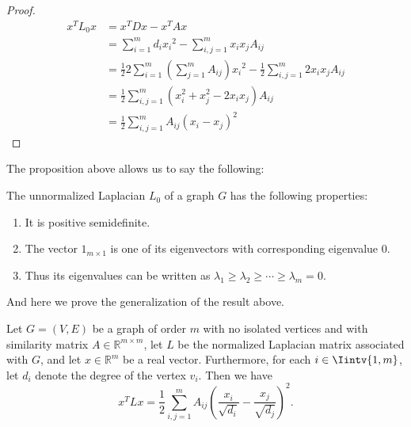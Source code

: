 \begin{proof}
   \begin{equation*} 
      \begin{split}
         x^TL_0x &= x^TDx - x^TAx \\
         &= \sum_{i=1}^m d_i{x_i}^2 - \sum_{i,j = 1}^m x_i  x_j A_{ij}  \\
         &= \frac{1}{2} 2 \sum_{i=1}^m \left( \sum_{j=1}^mA_{ij} \right){x_i}^2 - \frac{1}{2}\sum_{i,j = 1}^m 2x_i  x_j A_{ij}  \\
         &= \frac{1}{2} \sum_{i,j=1}^m (x_i^2 +x_j^2 - 2x_ix_j)A_{ij} \\
         &= \frac{1}{2} \sum_{i,j=1}^m A_{ij} \left( x_i - x_j \right) ^2
      \end{split}
   \end{equation*}
\end{proof}
   The proposition above allows us to say the following:
\begin{corollary}\label{unnormalizedLaplacianProperties}
   The unnormalized Laplacian $L_0$ of a graph $G$ has the following properties:
   \begin{enumerate}
      \item It is positive semidefinite.
      \item The vector $1_{m \times 1}$ is one of its eigenvectors with corresponding eigenvalue $0$.
      \item Thus its eigenvalues can be written as $\lambda_1 \ge \lambda_2 \ge \cdots \ge \lambda_m = 0$.
   \end{enumerate}
\end{corollary}

And here we prove the generalization of the result above.

\begin{proposition}\label{xtlx2}
   Let $G = (V,E)$ be a graph of order $m$ with no isolated vertices and with similarity matrix $A \in \mathbb R^{m \times m}$, let $L$ be the normalized Laplacian matrix associated with $G$, and let $x \in \mathbb R^{m} $ be a real vector. Furthermore, for each $i \in \Iintv{1,m}$, let $d_i$ denote the degree of the vertex $v_i$. Then we have
   \begin{equation}
      x^TLx = \frac{1}{2}\sum_{i,j = 1}^m A_{ij} \left( \frac{x_i}{\sqrt{d_i}} - \frac{x_j}{\sqrt{d_j}} \right)^2.
   \end{equation}
\end{proposition}

